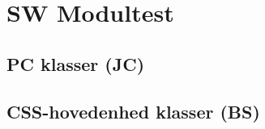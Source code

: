 \section{SW Modultest}

\subsection{PC klasser (JC)}


\clearpage

\subsection{CSS-hovedenhed klasser (BS)}


%
%
